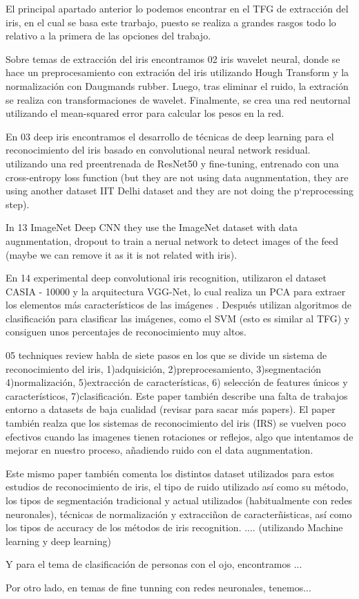 
El principal apartado anterior lo podemos encontrar en el TFG de extracción del iris, en el cual se basa este trarbajo, puesto se realiza a grandes rasgos
todo lo relativo a la primera de las opciones del trabajo.

Sobre temas de extracción del iris encontramos 02 iris wavelet neural, donde se hace un preprocesamiento con extración del iris utilizando Hough Transform y la 
normalización con Daugmands rubber. Luego, tras eliminar el ruido, la extración se realiza con transformaciones de wavelet. Finalmente, se crea una red neutornal
utilizando el mean-squared error para calcular los pesos en la red.

En 03 deep iris encontramos el desarrollo de técnicas de deep learning para el reconocimiento del iris basado en convolutional neural network residual. utilizando una red preentrenada 
de ResNet50 y fine-tuning, entrenado con una cross-entropy loss function (but they are not using data augnmentation, they are using another dataset IIT Delhi dataset and they are 
not doing the p`reprocessing step).

In 13 ImageNet Deep CNN they use the ImageNet dataset with data augnmentation, dropout to train a nerual network to detect images of the feed (maybe we can remove it as
it is not related with iris).

En 14 experimental deep convolutional iris recognition, utilizaron el dataset CASIA - 10000 y la arquitectura VGG-Net, lo cual realiza un PCA para extraer los elementos
más característicos de las imágenes . Después utilizan algoritmos de clasificación para clasificar las imágenes, como el SVM (esto es similar al TFG) y consiguen unos percentajes
de reconocimiento muy altos.

05 techniques review habla de siete pasos en los que se divide un sistema de reconocimiento del iris, 1)adquisición, 2)preprocesamiento, 3)segmentación
 4)normalización, 5)extracción de características, 6) selección de features únicos y característicos, 7)clasificación. Este paper también describe una falta de
 trabajos entorno a datasets de baja cualidad (revisar para sacar más papers). El paper también realza que los sistemas de reconocimiento del iris (IRS) se vuelven 
 poco efectivos cuando las imagenes tienen rotaciones or reflejos, algo que intentamos de mejorar en nuestro proceso, añadiendo ruido con el data augnmentation.

 Este mismo paper también comenta los distintos dataset utilizados para estos estudios de reconocimiento de iris, el tipo de ruido utilizado así como su método,
 los tipos de segmentación tradicional y actual utilizados (habitualmente con redes neuronales), técnicas de normalización y extracciñon de caracterñisticas, así 
 como los tipos de accuracy de los métodos de iris recognition.
.... (utilizando Machine learning y deep learning)

Y para el tema de clasificación de personas con el ojo, encontramos ...

Por otro lado, en temas de fine tunning con redes neuronales, tenemos...